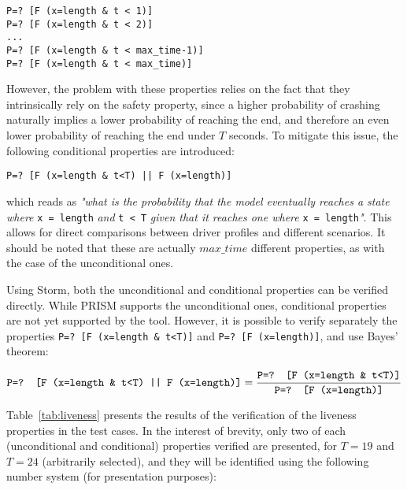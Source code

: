 \begin{minipage}{\linewidth}
{\vspace{1em}
\begin{lstlisting}
P=? [F (x=length & t < 1)]
P=? [F (x=length & t < 2)]
...
P=? [F (x=length & t < max_time-1)]
P=? [F (x=length & t < max_time)]
\end{lstlisting}
}
\end{minipage}

However, the problem with these properties relies on the fact that they intrinsically rely on the safety property, since a higher probability of crashing naturally implies a lower probability of reaching the end, and therefore an even lower probability of reaching the end under $T$ seconds. To mitigate this issue, the following conditional properties are introduced:

\begin{minipage}{\linewidth}
{\vspace{1em}
\begin{lstlisting}
P=? [F (x=length & t<T) || F (x=length)]
\end{lstlisting}
}
\end{minipage}

which reads as \textit{"what is the probability that the model eventually reaches a state where }\texttt{x = length}\textit{ and }\texttt{t < T}\textit{ given that it reaches one where} \texttt{x = length}\textit{"}. This allows for direct comparisons between driver profiles and different scenarios. It should be noted that these are actually $max\_time$ different properties, as with the case of the unconditional ones. 

Using Storm, both the unconditional and conditional properties can be verified directly. While PRISM supports the unconditional ones, conditional properties are not yet supported by the tool. However, it is possible to verify separately the properties \texttt{P=? [F (x=length \& t<T)]} and \texttt{P=? [F (x=length)]}, and use Bayes' theorem:

\begin{equation}
\text{\texttt{P=? [F (x=length \& t<T) || F (x=length)]}} = \frac{\text{\texttt{P=? [F (x=length \& t<T)]}}}{\text{\texttt{P=? [F (x=length)]}}}
\end{equation}

Table~\ref{tab:liveness} presents the results of the verification of the liveness properties in the test cases. In the interest of brevity, only two of each (unconditional and conditional) properties verified are presented, for $T = 19$ and $T = 24$ (arbitrarily selected), and they will be identified using the following number system (for presentation purposes):

